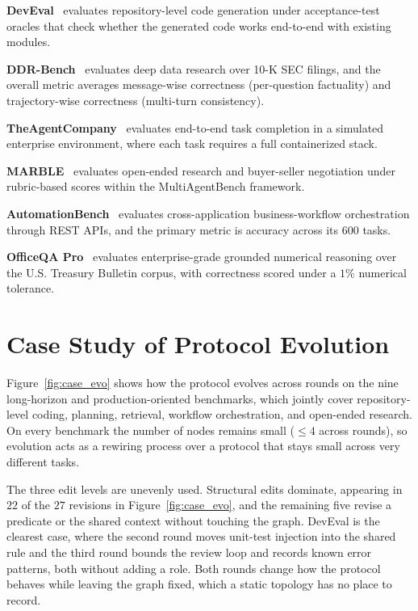 \documentclass{article} %
\begin{document}
\textbf{DevEval}~\citep{li2024deveval} evaluates repository-level code generation under acceptance-test oracles that check whether the generated code works end-to-end with existing modules.

\textbf{DDR-Bench}~\citep{liu2026ddrbench} evaluates deep data research over 10-K SEC filings, and the overall metric averages message-wise correctness (per-question factuality) and trajectory-wise correctness (multi-turn consistency).

\textbf{TheAgentCompany}~\citep{xu2024theagentcompany} evaluates end-to-end task completion in a simulated enterprise environment, where each task requires a full containerized stack.

\textbf{MARBLE}~\citep{zhu2025marble} evaluates open-ended research and buyer-seller negotiation under rubric-based scores within the MultiAgentBench framework.

\textbf{AutomationBench}~\citep{shepard2026automationbench} evaluates cross-application business-workflow orchestration through REST APIs, and the primary metric is accuracy across its 600 tasks.

\textbf{OfficeQA Pro}~\citep{opsahlong2026officeqa} evaluates enterprise-grade grounded numerical reasoning over the U.S. Treasury Bulletin corpus, with correctness scored under a $1\%$ numerical tolerance.

\section{Case Study of Protocol Evolution}
\label{app:case_study}

Figure~\ref{fig:case_evo} shows how the protocol evolves across rounds on the nine long-horizon and production-oriented benchmarks, which jointly cover repository-level coding, planning, retrieval, workflow orchestration, and open-ended research. On every benchmark the number of nodes remains small ($\leq 4$ across rounds), so evolution acts as a rewiring process over a protocol that stays small across very different tasks.

The three edit levels are unevenly used. Structural edits dominate, appearing in $22$ of the $27$ revisions in Figure~\ref{fig:case_evo}, and the remaining five revise a predicate or the shared context without touching the graph. DevEval is the clearest case, where the second round moves unit-test injection into the shared rule and the third round bounds the review loop and records known error patterns, both without adding a role. Both rounds change how the protocol behaves while leaving the graph fixed, which a static topology has no place to record.
\end{document}
